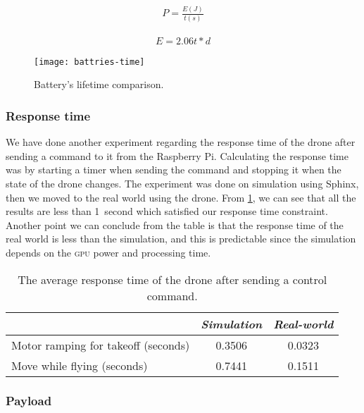 \documentclass[../main.tex]{subfiles}
\begin{document}
\begin{align}
	P = \frac{E(J)}{t(s)} 
	\label{eq:power}
\end{align}

\begin{align}
	E = 2.06t*d
	\label{eq:Energy-moving}
\end{align}

\begin{figure}[tbp]
	\centering
	\texttt{[image: battries-time]}
	\caption{Battery's lifetime comparison.}
	\label{fig:time-comparison}
\end{figure}

\subsubsection{Response time}

We have done another experiment regarding the response time 
of the drone after sending a command to it from the Raspberry Pi. 
Calculating the response time was by starting a timer when 
sending the command and stopping it when the 
state of the drone changes. 
The experiment was done on simulation using Sphinx,
then we moved to the real world using the \anafi drone.
From \cref{tab:respone-time}, 
we can see that all the results are less than \SI{1}{second}
which satisfied our response time constraint.
Another point we can conclude from the table is that 
the response time of the real world is less than 
the simulation, and this is predictable since the simulation
depends on the \textsc{gpu} power and processing time. 

\begin{table}[tbp]
	\centering
	\caption{The average response time of the drone after sending a control command.}
	\label{tab:respone-time}
	\begin{tabularx}{0.7\textwidth}{ X c c }
		\toprule
		\textit{} & \textit{Simulation} & \textit{Real-world}\\ \midrule
		Motor ramping for takeoff (seconds)  & 0.3506 & 0.0323     \\
		Move while flying (seconds) & 0.7441  & 0.1511   \\
		\bottomrule
	\end{tabularx}
\end{table} 

\subsubsection{Payload}
\end{document}

